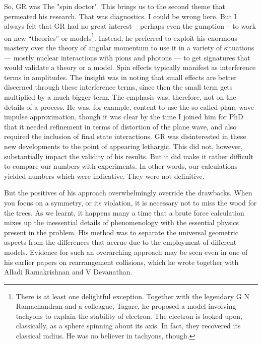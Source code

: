 So, GR was The "spin doctor". This brings us to the second theme that permeated his research. That was diagnostics. I could be wrong here. But I always felt that GR had no great interest -- perhaps even the gumption -- to work on new “theories” or models\footnote{There is at least one delightful exception. Together with the legendary G N Ramachandran and a colleague, Tagare, he proposed a model involving tachyons to explain the stability of electron. The electron is looked upon, classically, as a sphere spinning about its axis. In fact, they recovered its classical radius.  He was no believer in tachyons, though.}. Instead, he preferred to exploit his enormous mastery over the theory of angular momentum to use it in a variety of situations --- mostly nuclear interactions with pions and photons — to get signatures that would validate a theory or a model. Spin effects typically manifest as interference terms in amplitudes. The insight was in noting that small effects are better discerned through these interference terms, since then the small term gets multiplied by a much bigger term.  The emphasis was, therefore, not on the details of a process. He was, for example, content to use the so called plane wave impulse approximation, though it was clear by the time I joined him for PhD that it needed refinement in terms of distortion of the plane wave, and also required the inclusion of final state interactions. GR was disinterested in these new developments to the point of appearing lethargic. This did not, however, substantially impact the validity of his results. But it did make it rather difficult to compare our numbers with experiments. In other words, our calculations yielded numbers which were indicative. They were not definitive.

But the positives of his approach overwhelmingly override the drawbacks. When you focus on a symmetry, or its violation, it is necessary not to miss the wood for the trees. As we learnt, it happens many a time that a brute force calculation mixes up the inessential details of phenomenology with the essential physics present in the problem. His method was to separate the universal geometric aspects from the differences that accrue due to the employment of different models. Evidence for such an overarching approach may be seen even in one of his earlier papers on rearrangement collisions, which he wrote together with Alladi Ramakrishnan and V Devanathan.


